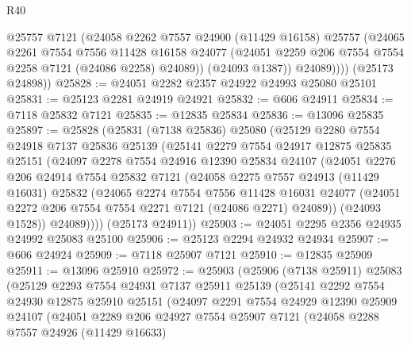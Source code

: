 \begin{lexlean}{R40}
\begin{coremodule}
              @25757
              @7121
              (@24058
                @2262
                @7557
                @24900
                (@11429 @16158)
                @25757
                (@24065
                  @2261
                  @7554
                  @7556
                  @11428
                  @16158
                  @24077
                  (@24051 @2259 @206 @7554 @7554 @2258 @7121 (@24086 @2258) @24089))
                (@24093 @1387))
              @24089))))
      (@25173 @24898))
@25828 := @24051 @2282 @2357 @24922 @24993 @25080 @25101
@25831 := @25123 @2281 @24919 @24921
@25832 := @606 @24911
@25834 := @7118 @25832 @7121
@25835 := @12835 @25834
@25836 := @13096 @25835
@25897 := @25828
    (@25831
      (@7138 @25836)
      @25080
      (@25129
        @2280
        @7554
        @24918
        @7137
        @25836
        @25139
        (@25141
          @2279
          @7554
          @24917
          @12875
          @25835
          @25151
          (@24097
            @2278
            @7554
            @24916
            @12390
            @25834
            @24107
            (@24051
              @2276
              @206
              @24914
              @7554
              @25832
              @7121
              (@24058
                @2275
                @7557
                @24913
                (@11429 @16031)
                @25832
                (@24065
                  @2274
                  @7554
                  @7556
                  @11428
                  @16031
                  @24077
                  (@24051 @2272 @206 @7554 @7554 @2271 @7121 (@24086 @2271) @24089))
                (@24093 @1528))
              @24089))))
      (@25173 @24911))
@25903 := @24051 @2295 @2356 @24935 @24992 @25083 @25100
@25906 := @25123 @2294 @24932 @24934
@25907 := @606 @24924
@25909 := @7118 @25907 @7121
@25910 := @12835 @25909
@25911 := @13096 @25910
@25972 := @25903
    (@25906
      (@7138 @25911)
      @25083
      (@25129
        @2293
        @7554
        @24931
        @7137
        @25911
        @25139
        (@25141
          @2292
          @7554
          @24930
          @12875
          @25910
          @25151
          (@24097
            @2291
            @7554
            @24929
            @12390
            @25909
            @24107
            (@24051
              @2289
              @206
              @24927
              @7554
              @25907
              @7121
              (@24058
                @2288
                @7557
                @24926
                (@11429 @16633)

\end{coremodule}
\end{lexlean}
